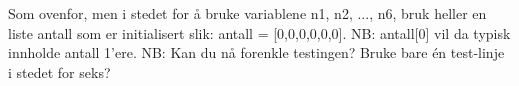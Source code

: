 %
%
Som ovenfor, men i stedet for å bruke variablene n1, n2, ..., n6, bruk heller en liste antall som er initialisert slik: antall = [0,0,0,0,0,0]. NB: antall[0] vil da typisk innholde antall 1'ere. NB: Kan du nå forenkle testingen? Bruke bare én test-linje i stedet for seks?
